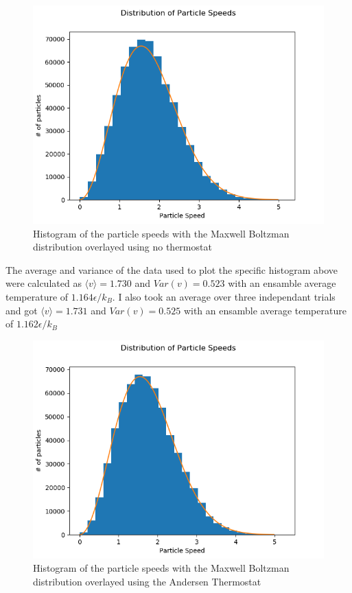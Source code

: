 \documentclass{article}
\begin{document}
	\begin{figure}[H]
				\centering
				\includegraphics[scale=0.5]{speeds_nothermo}
				\caption{Histogram of the particle speeds with the Maxwell Boltzman distribution overlayed using no thermostat}
	\end{figure}


	The average and variance of the data used to plot the specific histogram above were calculated as $\langle v \rangle = 1.730$ and $Var(v) = 0.523$ with an ensamble average temperature of $1.164 \epsilon / k_B$. I also took an average over three independant trials and got $\langle v \rangle = 1.731$ and $Var(v) = 0.525$ with an ensamble average temperature of $1.162 \epsilon / k_B$


	\begin{figure}[H]
				\centering
				\includegraphics[scale=0.5]{speeds}
				\caption{Histogram of the particle speeds with the Maxwell Boltzman distribution overlayed using the Andersen Thermostat}
	\end{figure}
\end{document}
